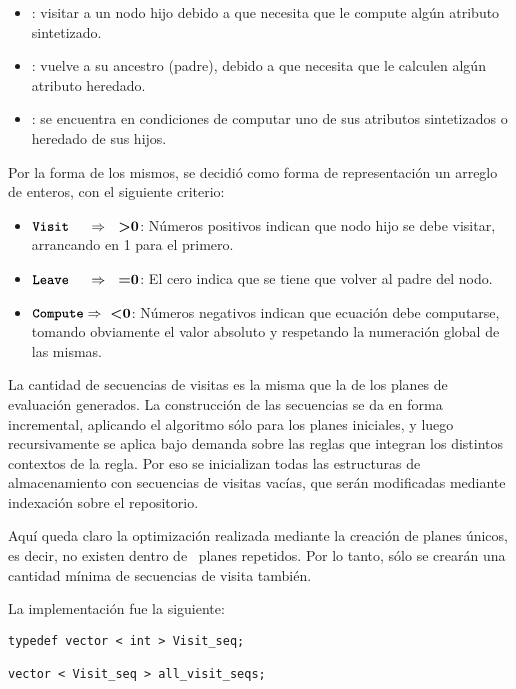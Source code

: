 \begin{itemize}
\item {}: visitar a un nodo hijo debido a que necesita que le compute algún atributo sintetizado.
\item {}: vuelve a su ancestro (padre), debido a que necesita que le calculen algún atributo heredado.
\item {}: se encuentra en condiciones de computar uno de sus atributos sintetizados o heredado de sus hijos.
\end{itemize}

Por la forma de los mismos, se decidió como forma de representación un arreglo de enteros, con el siguiente criterio:

\begin{itemize}
\item $\textbtt{Visit}\ \ \ \  \Rightarrow \ \ \textbf{>0}$: Números positivos indican que nodo hijo se debe visitar, arrancando en 1 para el primero.
\item $\textbtt{Leave}\ \ \ \  \Rightarrow \ \ \textbf{=0}$: El cero indica que se tiene que volver al padre del nodo.
\item $\textbtt{Compute} \Rightarrow \ \textbf{<0}$: Números negativos indican que ecuación debe computarse, tomando obviamente el valor absoluto y respetando la numeración global de las mismas.
\end{itemize}

La cantidad de secuencias de visitas es la misma que la de los planes de evaluación generados. La construcción de las secuencias se da en forma incremental, aplicando el algoritmo sólo para los planes iniciales, y luego recursivamente se aplica bajo demanda sobre las reglas que integran los distintos contextos de la regla. Por eso se inicializan todas las estructuras de almacenamiento con secuencias de visitas vacías, que serán modificadas mediante indexación sobre el repositorio.

Aquí queda claro la optimización realizada mediante la creación de planes únicos, es decir, no existen dentro de \maggen\ planes repetidos. Por lo tanto, sólo se crearán una cantidad mínima de secuencias de visita también. 


La implementación fue la siguiente:

\begin{lstlisting}[columns=fullflexible, linewidth=7cm]
typedef vector < int > Visit_seq;

vector < Visit_seq > all_visit_seqs;
\end{lstlisting}

